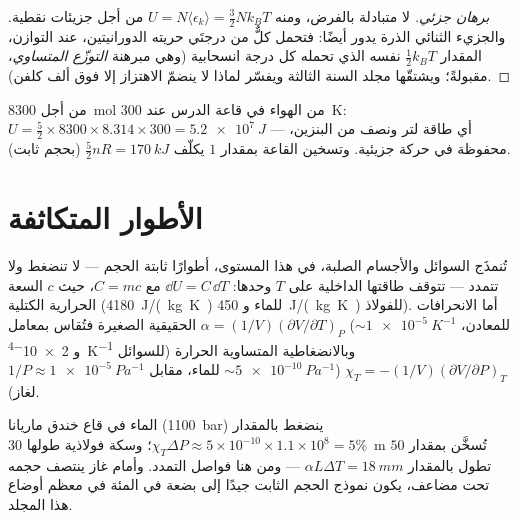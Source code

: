 \begin{proof}[برهان جزئي]
لا  متبادلة بالفرض، ومنه $U = N\langle\epsilon_k\rangle
= \tfrac32 Nk_BT$ من أجل جزيئات نقطية. والجزيء الثنائي الذرة يدور أيضًا:
فتحمل كلٌّ من درجتَي حريته الدورانيتين، عند التوازن،
المقدار $\tfrac12 k_BT$ نفسه الذي تحمله كل درجة انسحابية (وهي مبرهنة
\emph{التوزّع المتساوي}، مقبولةً؛ ويشتقّها مجلد السنة الثالثة ويفسّر لماذا
لا ينضمّ الاهتزاز إلا فوق ألف كلفن).
\end{proof}

\begin{example}\label{ex:b1:kinetic-theory:room}
من أجل \qty{8300}{mol} من الهواء في قاعة الدرس عند \qty{300}{K}: $U = \tfrac52 \times
8300 \times 8.314 \times 300 = \qty{5.2e7}{J}$ --- أي طاقة لتر ونصف
من البنزين، محفوظة في حركة جزيئية. وتسخين القاعة بمقدار $1$ 
يكلّف $\tfrac52 nR = \qty{170}{kJ}$ (بحجم ثابت).
\end{example}

\section{الأطوار المتكاثفة}

\begin{proposition}\label{prop:b1:kinetic-theory:condensed}
تُنمذَج السوائل والأجسام الصلبة، في هذا المستوى، أطوارًا ثابتة
الحجم --- لا تنضغط ولا تتمدد --- تتوقف طاقتها الداخلية
على $T$ وحدها: $\dd U = C\,\dd T$ مع $C = mc$، حيث $c$ السعة الحرارية
الكتلية (\qty{4180}{J/(kg.K)} للماء و \qty{450}{J/(kg.K)} للفولاذ). أما
الانحرافات الحقيقية الصغيرة فتُقاس بمعامل 
$\alpha = (1/V)(\partial V/\partial T)_P$ ($\sim\qty{1e-5}{K^{-1}}$
للمعادن، و \qty{2e-4}{K^{-1}} للسوائل) وبالانضغاطية
المتساوية الحرارة $\chi_T = -(1/V)(\partial V/\partial P)_T$ ($\sim\qty{5e-10}{Pa^{-1}}$
للماء، مقابل $1/P \approx \qty{1e-5}{Pa^{-1}}$ لغاز).
\end{proposition}
\admitted

\begin{example}\label{ex:b1:kinetic-theory:water}
الماء في قاع خندق ماريانا (\qty{1100}{bar}) ينضغط
بالمقدار $\chi_T\Delta P \approx 5\times10^{-10} \times 1.1\times10^8 = 5\%$؛ وسكة
فولاذية طولها \qty{30}{m} تُسخَّن بمقدار $50$  تطول بالمقدار $\alpha L\Delta T =
\qty{18}{mm}$ --- ومن هنا فواصل التمدد. وأمام غاز ينتصف
حجمه تحت  مضاعف، يكون نموذج الحجم الثابت
جيدًا إلى بضعة في المئة في معظم أوضاع هذا المجلد.
\end{example}

